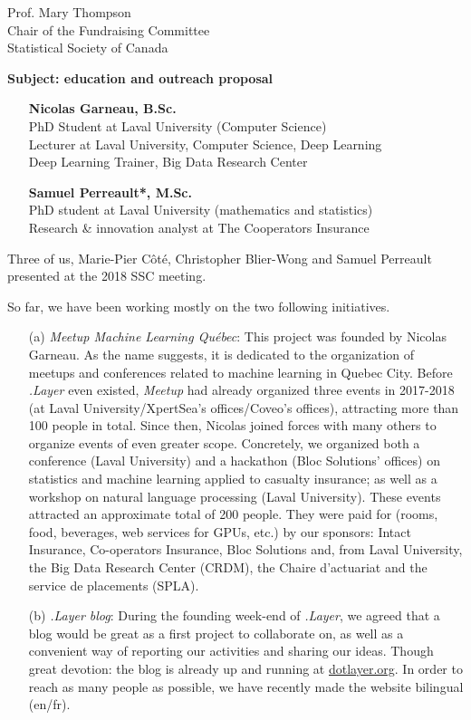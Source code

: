 \documentclass[11pt, a4paper]{letter} %
\begin{document}
\begin{letter}{
	Prof. Mary Thompson\\
	Chair of the Fundraising Committee\\
	Statistical Society of Canada
	
	\bigskip
	\textbf{Subject: education and outreach proposal}%
}
\begin{enumerate}
	\quad Assistant professor, École d'actuariat, Laval University\\
	\quad Teaching chair on big data analysis for actuariat science --- Intact\\
	\quad Member of the \emph{New Investigators Committee} of the \emph{SSC}
	\item[] \textbf{Nicolas Garneau, B.Sc.}\\
	\quad PhD Student at Laval University (Computer Science)\\
	Lecturer at Laval University, Computer Science, Deep Learning\\
	Deep Learning Trainer, Big Data Research Center
	\item[] \textbf{Samuel Perreault*, M.Sc.}\\
	\quad PhD student at Laval University (mathematics and statistics)\\
	\quad Research \& innovation analyst at The Cooperators Insurance
\end{enumerate}

\noindent Three of us, Marie-Pier Côté, Christopher Blier-Wong and Samuel Perreault presented at the 2018 SSC meeting.

So far, we have been working mostly on the two following initiatives.
\begin{enumerate}
	\item[(a)] \emph{Meetup Machine Learning Québec}: This project was founded by Nicolas Garneau. As the name suggests, it is dedicated to the organization of meetups and conferences related to machine learning in Quebec City. Before \emph{.Layer} even existed, \emph{Meetup} had already organized three events in 2017-2018 (at Laval University/XpertSea's offices/Coveo's offices), attracting more than 100 people in total. Since then, Nicolas joined forces with many others to organize events of even greater scope. Concretely, we organized both a conference (Laval University) and a hackathon (Bloc Solutions' offices) on statistics and machine learning applied to casualty insurance; as well as a workshop on natural language processing (Laval University). These events attracted an approximate total of 200 people. They were paid for (rooms, food, beverages, web services for GPUs, etc.) by our sponsors: Intact Insurance, Co-operators Insurance, Bloc Solutions and, from Laval University, the Big Data Research Center (CRDM), the Chaire d'actuariat and the service de placements (SPLA).
	\item[(b)] \emph{.Layer blog}: During the founding week-end of \emph{.Layer}, we agreed that a blog would be great as a first project to collaborate on, as well as a convenient way of reporting our activities and sharing our ideas. Though great devotion: the blog is already up and running at \href{https://www.dotlayer.org/}{dotlayer.org}. In order to reach as many people as possible, we have recently made the website bilingual (en/fr).
\end{enumerate}


\end{letter}
\end{document}
